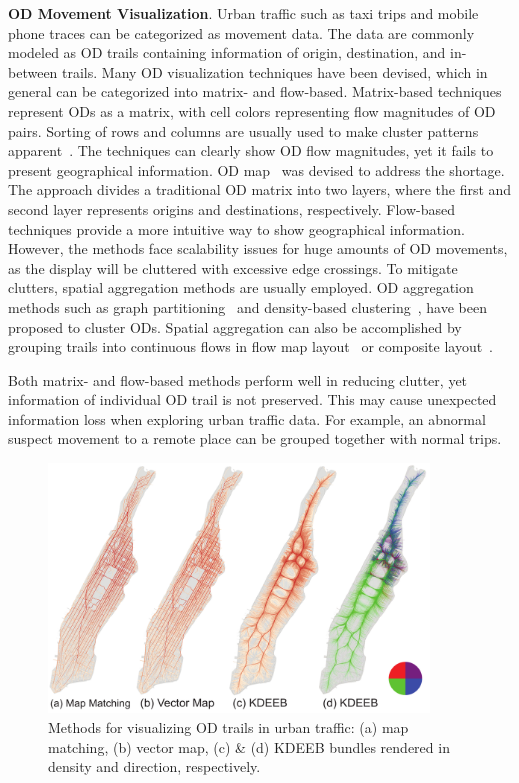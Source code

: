\noindent
\textbf{OD Movement Visualization}.
Urban traffic such as taxi trips and mobile phone traces can be categorized as movement data.
The data are commonly modeled as OD trails containing information of origin, destination, and in-between trails.
Many OD visualization techniques have been devised, which in general can be categorized into matrix- and flow-based. 
Matrix-based techniques represent ODs as a matrix, with cell colors representing flow magnitudes of OD pairs.
Sorting of rows and columns are usually used to make cluster patterns apparent~\cite{wilkinson2009history}.
The techniques can clearly show OD flow magnitudes, yet it fails to present geographical information. 
OD map~\cite{wood2010visualisation} was devised to address the shortage.
The approach divides a traditional OD matrix into two layers, where the first and second layer represents origins and destinations, respectively.
Flow-based techniques provide a more intuitive way to show geographical information.
However, the methods face scalability issues for huge amounts of OD movements, as the display will be cluttered with excessive edge crossings.
To mitigate clutters, spatial aggregation methods are usually employed.
OD aggregation methods such as graph partitioning~\cite{guo2009flow} and density-based clustering~\cite{von2016mobilitygraphs}, have been proposed to cluster ODs.
Spatial aggregation can also be accomplished by grouping trails into continuous flows in flow map layout~\cite{phan2005flow} or composite layout~\cite{cornel_2016_composite}.

Both matrix- and flow-based methods perform well in reducing clutter, yet information of individual OD trail is not preserved.
This may cause unexpected information loss when exploring urban traffic data.
For example, an abnormal suspect movement to a remote place can be grouped together with normal trips.

\begin{figure}[t] 
	\centering
	\includegraphics[width=0.90\textwidth]{figure/edgebundling/fig1_alternatives/alternatives}
	\vspace{-3mm}
	\caption{Methods for visualizing OD trails in urban traffic: (a) map matching, (b) vector map, (c) \& (d) KDEEB bundles rendered in density and direction, respectively.}
	\label{fig:alternatives}
	\vspace{-1mm}
\end{figure}

